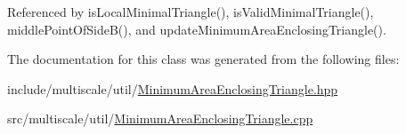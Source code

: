 Referenced by is\-Local\-Minimal\-Triangle(), is\-Valid\-Minimal\-Triangle(), middle\-Point\-Of\-Side\-B(), and update\-Minimum\-Area\-Enclosing\-Triangle().



The documentation for this class was generated from the following files\-:\begin{DoxyCompactItemize}
\item 
include/multiscale/util/\hyperlink{MinimumAreaEnclosingTriangle_8hpp}{Minimum\-Area\-Enclosing\-Triangle.\-hpp}\item 
src/multiscale/util/\hyperlink{MinimumAreaEnclosingTriangle_8cpp}{Minimum\-Area\-Enclosing\-Triangle.\-cpp}\end{DoxyCompactItemize}
